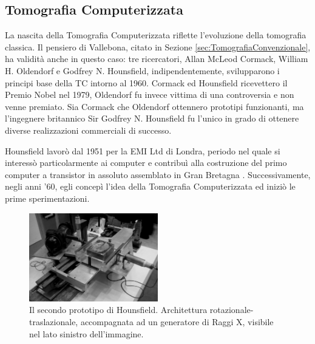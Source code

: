 \documentclass[a4paper,12pt, doubleside]{report}
\begin{document}
            \subsection{Tomografia Computerizzata}
                \par      
                    La nascita della Tomografia Computerizzata riflette l'evoluzione della tomografia classica. Il pensiero di Vallebona, citato in Sezione \ref{sec:TomografiaConvenzionale}, ha validità anche in questo caso: tre ricercatori, Allan McLeod Cormack, William H. Oldendorf e Godfrey N. Hounsfield, indipendentemente, svilupparono i principi base della TC intorno al 1960. Cormack ed Hounsfield ricevettero il Premio Nobel nel 1979, Oldendorf fu invece vittima di una controversia \cite{nobel-debate} e non venne premiato. 
                    Sia Cormack che Oldendorf ottennero prototipi funzionanti, ma l'ingegnere britannico Sir Godfrey N. Hounsfield fu l'unico in grado di ottenere diverse realizzazioni commerciali di successo.
                
                \bigskip
                \par
                    Hounsfield lavorò dal 1951 per la EMI Ltd di Londra, periodo nel quale si interessò particolarmente ai computer e contribuì alla costruzione del primo computer a transistor in assoluto assemblato in Gran Bretagna \cite{hounsfield-autobiografia}. Successivamente, negli anni '60, egli concepì l’idea della Tomografia Computerizzata ed iniziò le prime sperimentazioni.
                            
                    \begin{figure}[h]
                        \centering
                        \includegraphics[width=0.5\textwidth]{hounsfield_prototype2}
                        \caption{Il secondo prototipo di Hounsfield. Architettura rotazionale-traslazionale, accompagnata ad un generatore di Raggi X, visibile nel lato sinistro dell'immagine.}
                        \label{fig:second-prototype}
                    \end{figure}
                            
\end{document}
